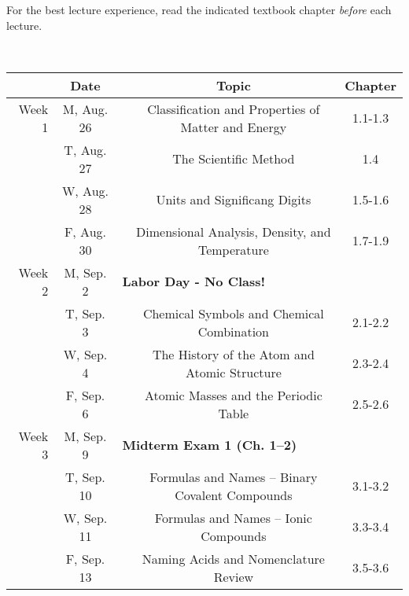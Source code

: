 \documentclass[12pt, letterpaper]{article}
\begin{document}
\noindent For the best lecture experience, read the indicated textbook chapter \emph{before} each lecture.

~

\noindent
\begin{tabular}{rcccc}
	& Date && Topic & Chapter\\
	\midrule
	Week 1 & M, Aug. 26&& Classification and Properties of Matter and Energy & 1.1-1.3\\
	& T, Aug. 27&& The Scientific Method & 1.4\\
	& W, Aug. 28&& Units and Significang Digits & 1.5-1.6\\
	& F, Aug. 30&& Dimensional Analysis, Density, and Temperature & 1.7-1.9\\
	\midrule
	Week 2 & M, Sep. 2& \multicolumn{3}{l}{\textbf{Labor Day - No Class!}}\\
	& T, Sep. 3&& Chemical Symbols and Chemical Combination & 2.1-2.2\\
	& W, Sep. 4&& The History of the Atom and Atomic Structure & 2.3-2.4\\
	& F, Sep. 6&& Atomic Masses and the Periodic Table & 2.5-2.6\\
	\midrule
	Week 3 & M, Sep. 9& \multicolumn{3}{l}{\textbf{Midterm Exam 1 (Ch. 1--2)}}\\
	& T, Sep. 10&& Formulas and Names -- Binary Covalent Compounds & 3.1-3.2\\
	& W, Sep. 11&& Formulas and Names -- Ionic Compounds & 3.3-3.4\\
	& F, Sep. 13&& Naming Acids and Nomenclature Review & 3.5-3.6\\
\end{tabular}
\end{document}
